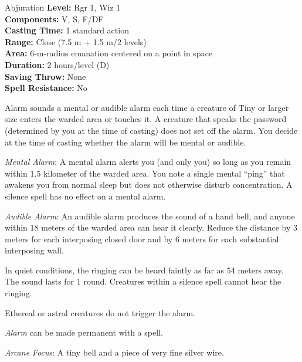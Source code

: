 {Abjuration}
{
	\textbf{Level:}
	Rgr 1, Wiz 1\\
	\textbf{Components:}
	V, S, F/DF\\
	\textbf{Casting Time:}
	1 standard action\\
	\textbf{Range:}
	Close (7.5 m + 1.5 m/2 levels)\\
	\textbf{Area:}
	6-m-radius emanation centered on a point in space\\
	\textbf{Duration:}
	2 hours/level (D)\\
	\textbf{Saving Throw:}
	None\\
	\textbf{Spell Resistance:}
	No\\
}
{
	Alarm sounds a mental or audible alarm each time a creature of Tiny or larger size enters the warded area or touches it. A creature that speaks the password (determined by you at the time of casting) does not set off the alarm. You decide at the time of casting whether the alarm will be mental or audible.

	\textit{Mental Alarm}:
	A mental alarm alerts you (and only you) so long as you remain within 1.5 kilometer of the warded area. You note a single mental ``ping'' that awakens you from normal sleep but does not otherwise disturb concentration. A silence spell has no effect on a mental alarm.

	\textit{Audible Alarm}:
	An audible alarm produces the sound of a hand bell, and anyone within 18 meters of the warded area can hear it clearly. Reduce the distance by 3 meters for each interposing closed door and by 6 meters for each substantial interposing wall.

	In quiet conditions, the ringing can be heard faintly as far as 54 meters away. The sound lasts for 1 round. Creatures within a silence spell cannot hear the ringing.

	Ethereal or astral creatures do not trigger the alarm.

	\emph{Alarm} can be made permanent with a  spell.

	\textit{Arcane Focus}:
	A tiny bell and a piece of very fine silver wire.

}
